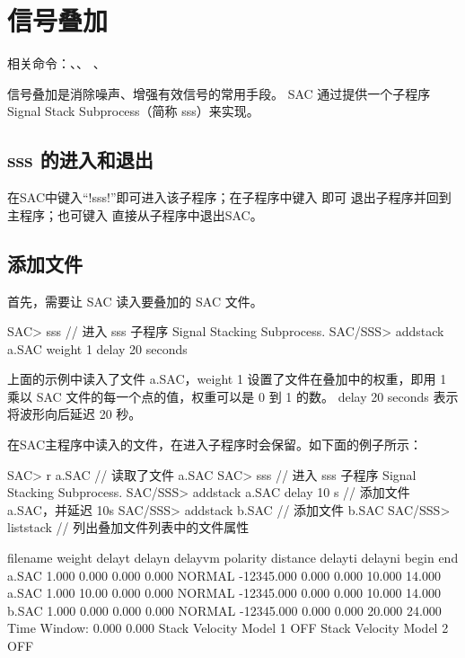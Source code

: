 \section{信号叠加}
\label{sec:stack-traces}
相关命令：、、
、

信号叠加是消除噪声、增强有效信号的常用手段。
SAC 通过提供一个子程序 Signal Stack Subprocess（简称 sss）来实现。

\subsection{sss 的进入和退出}
在SAC中键入``!sss!''即可进入该子程序；在子程序中键入  即可
退出子程序并回到主程序；也可键入  直接从子程序中退出SAC。

\subsection{添加文件}

首先，需要让 SAC 读入要叠加的 SAC 文件。
\begin{SACCode}
SAC> sss   // 进入 sss 子程序
Signal Stacking Subprocess.
SAC/SSS> addstack a.SAC weight 1 delay 20 seconds
\end{SACCode}

上面的示例中读入了文件 a.SAC，weight 1 设置了文件在叠加中的权重，即用 1 乘以
SAC 文件的每一个点的值，权重可以是 0 到 1 的数。
delay 20 seconds 表示将波形向后延迟 20 秒。

在SAC主程序中读入的文件，在进入子程序时会保留。如下面的例子所示：

\begin{SACCode}
SAC> r a.SAC    // 读取了文件 a.SAC
SAC> sss   // 进入 sss 子程序
Signal Stacking Subprocess.
SAC/SSS> addstack a.SAC delay 10 s    // 添加文件 a.SAC，并延迟 10s
SAC/SSS> addstack b.SAC               // 添加文件 b.SAC
SAC/SSS> liststack    // 列出叠加文件列表中的文件属性

 filename  weight      delayt      delayn     delayvm   polarity   distance
                           delayti     delayni      begin       end
 a.SAC         1.000       0.000       0.000       0.000   NORMAL   -12345.000
                             0.000       0.000      10.000      14.000
 a.SAC         1.000       10.00       0.000       0.000   NORMAL   -12345.000
                             0.000       0.000      10.000      14.000
 b.SAC         1.000       0.000       0.000       0.000   NORMAL   -12345.000
                             0.000       0.000      20.000      24.000
 Time Window:       0.000       0.000
 Stack Velocity Model 1 OFF
 Stack Velocity Model 2 OFF
\end{SACCode}

